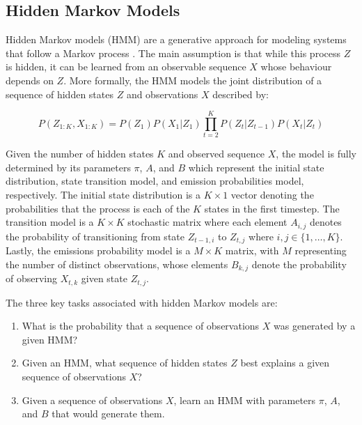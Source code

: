 \documentclass[preprint,1p, times,authoryear]{elsarticle}
\begin{document}


\subsection{Hidden Markov Models} 
\label{hmm}

Hidden Markov models (HMM) are a generative approach for modeling systems that follow a Markov process \citep{hmm}.
The main assumption is that while this process $Z$ is hidden, it can be learned from an observable sequence $X$ whose behaviour depends on $Z$. More formally, the HMM models the joint distribution of a sequence of hidden states $Z$ and observations $X$ described by:

\begin{equation}
    P(Z_{1:K}, X_{1:K}) = P(Z_{1})P(X_{1}|Z_{1}) \prod_{t=2}^{K} P(Z_{t}|Z_{t-1})P(X_{t}|Z_{t})
    \label{eqhmm1}
\end{equation}

Given the number of hidden states $K$ and observed sequence $X$, the model is fully determined by its parameters $\pi$, $A$, and $B$ which represent the initial state distribution, state transition model, and emission probabilities model, respectively. The initial state distribution is a $K \times 1$ vector denoting the probabilities that the process is each of the $K$ states in the first timestep. The transition model is a $K \times K$ stochastic matrix where each element $A_{i,j}$ denotes the probability of transitioning from state $Z_{t-1, i}$ to $Z_{t, j}$ where $i, j \in \{1, \dots, K\}$. Lastly, the emissions probability model is a $M \times K$ matrix, with $M$ representing the number of distinct observations, whose elements $B_{k, j}$ denote the probability of observing $X_{t, k}$ given state $Z_{t, j}$.


The three key tasks associated with hidden Markov models are: %
\begin{enumerate}[noitemsep]
    \item What is the probability that a sequence of observations $X$ was generated by a given HMM?
    \item Given an HMM, what sequence of hidden states $Z$ best explains a given sequence of observations $X$?
    \item Given a sequence of observations $X$, learn an HMM with parameters $\pi$, $A$, and $B$ that would generate them.
\end{enumerate}
\end{document}
